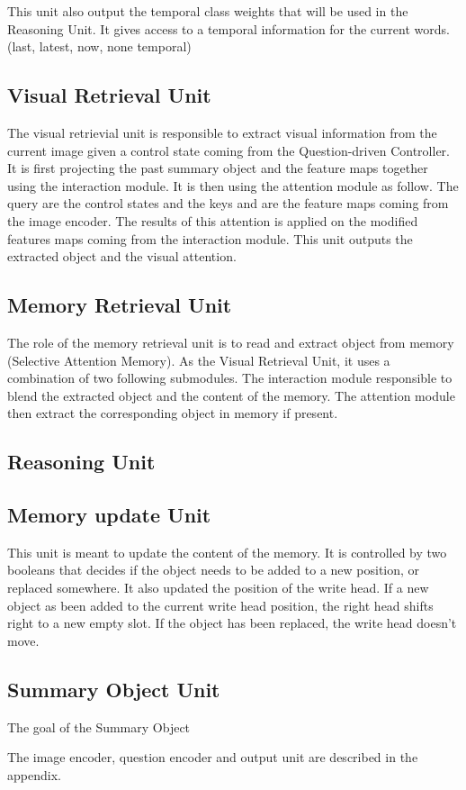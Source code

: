 This unit also output the temporal class weights that will be used in the Reasoning Unit. It gives access to a temporal information for the current words. (last, latest, now, none temporal)

\subsection{Visual Retrieval Unit}

The visual retrievial unit is responsible to extract visual information from the current image given a control state coming from the Question-driven Controller. It is first projecting the past summary object and the feature maps together using the interaction module.
It is then using the attention module as follow. The query are the control states and the keys and are the feature maps coming from the image encoder. The results of this attention is applied on the modified features maps coming from the interaction module.  
This unit outputs the extracted object and the visual attention.

\subsection{Memory Retrieval Unit}

The role of the memory retrieval unit is to read and extract object from memory (Selective Attention Memory).
As the Visual Retrieval Unit, it uses a combination of two following submodules. The interaction module responsible to blend the extracted object and the content of the memory. The attention module then extract the corresponding object in memory if present.


\subsection{Reasoning Unit}


\subsection{Memory update Unit}

This unit is meant to update the content of the memory. It is controlled by two booleans that decides if the object needs to be added to a new position, or replaced somewhere. 
It also updated the position of the write head. If a new object as been added to the current write head position, the right head shifts right to a new empty slot. If the object has been replaced, the write head doesn't move.

\subsection{Summary Object  Unit}

The goal of the Summary Object 

The image encoder, question encoder and output unit are described in the appendix.
